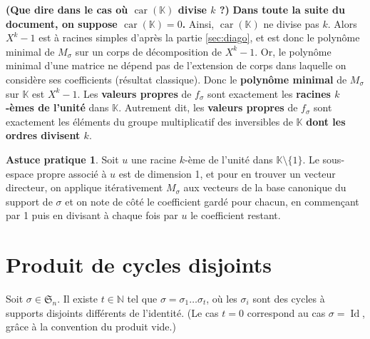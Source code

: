 \documentclass[10pt,a4paper,french,landscape]{article}
\theoremstyle{definition}
\newtheorem*{as}{Astuce pratique}
\theoremstyle{remark}
\DeclareMathOperator{\Id}{Id}
\DeclareMathOperator{\car}{car}
\newcommand{\NN}{\mathbb N}
\newcommand{\KK}{\mathbb K}
\newcommand{\Sy}{\mathfrak{S}}
\newcommand{\1}{\mathbbm{1}}
\newcommand{\Sn}[1][n]{\Sy_{#1}}
\begin{document}
\begin{multicols*}{2}
\textbf{(Que dire dans le cas où $\car(\KK)$ divise $k$ ?)}
\textbf{Dans toute la suite du document, on suppose $\car(\KK)=0$.} Ainsi, $\car(\KK)$ ne divise pas $k$.
Alors $X^k-1$ est à racines simples d'après la partie \ref{sec:diago}, et est donc le polynôme minimal de $M_\sigma$ sur un corps de décomposition de $X^k-1$. Or, le polynôme minimal d'une matrice ne dépend pas de l'extension de corps dans laquelle on considère ses coefficients (résultat classique). Donc le \textbf{polynôme minimal} de $M_\sigma$ sur $\KK$ est $X^k-1$. Les \textbf{valeurs propres} de $f_\sigma$ sont exactement les \textbf{racines $k$-èmes de l'unité} dans $\KK$. Autrement dit, les \textbf{valeurs propres} de $f_\sigma$ sont exactement les éléments du groupe multiplicatif des inversibles de $\KK$ \textbf{dont les ordres divisent $k$}.
\medskip


\begin{as}
Soit $u$ une racine $k$-ème de l'unité dans $\KK\setminus\{1\}$. Le sous-espace propre associé à $u$ est de dimension 1, et pour en trouver un vecteur directeur, on applique itérativement $M_\sigma$ aux vecteurs de la base canonique du support de $\sigma$ et on note de côté le coefficient gardé pour chacun, en commençant par 1 puis en divisant à chaque fois par $u$ le coefficient restant.
\end{as}

\section{Produit de cycles disjoints}
\label{sec:pdt}

Soit $\sigma\in\Sn$. Il existe $t\in\NN$ tel que $\sigma=\sigma_1\dots\sigma_t$, où les $\sigma_i$ sont des cycles à supports disjoints différents de l'identité. (Le cas $t=0$ correspond au cas $\sigma=\Id$, grâce à la convention du produit vide.)


\end{multicols*}
\end{document}
